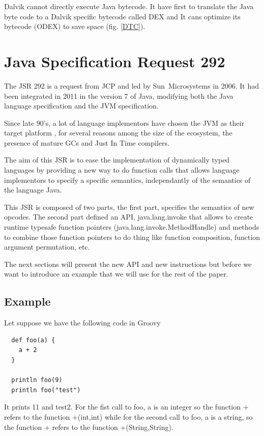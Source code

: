 \documentclass{sigplanconf}
\def \JCP{JCP\xspace}
\def \SUN{\mbox{Sun Microsystems}\xspace}
\def \DALVIK{\mbox{Dalvik}\xspace}
\def \Jsr{JSR\xspace}
\def \JSR{\Jsr 292\xspace}
\def \JVM{JVM\xspace}
\def \DEX{\mbox{DEX}\xspace}
\begin{document}
      \DALVIK cannot directly execute Java bytecode.
      It have first to translate the Java byte code to a \DALVIK specific bytecode called \DEX
      and It cans optimize its bytecode (\mbox{ODEX}) to save space (fig. \ref{DTC}).

  \section{Java Specification Request 292}

    The \JSR is a request from \JCP and led by \SUN in 2006.
    It had been integrated in 2011 in the version 7 of Java,
    modifying both the Java language specification and the \JVM specification.

    Since late 90's, a lot of language
    implementors have chosen the JVM as their target platform \cite{wiki-jvm-lang},
    for several reasons among the size of the ecosystem,
    the presence of mature GCs and Just In Time compilers. 

    The aim of this \Jsr is to ease the implementation of dynamically typed languages
    by providing a new way to do function calls that allows language implementors
    to specify a specific semantics, independantly of the semantics of the language Java.
    
    This \Jsr is composed of two parts, the first part, specifies the semantics of
    new opcodes. The second part defined an API, java.lang.invoke that allows
    to create runtime typesafe function pointers (java.lang.invoke.MethodHandle) and
    methods to combine those function pointers to do thing like function composition,
    function argument permutation, etc.

    The next sections will present the new API and new instructions but before
    we want to introduce an example that we will use for the rest of the paper.

    \subsection{Example}
      Let suppose we have the following code in Groovy \cite{lang-groovy}
      
      {\tiny      
      \begin{verbatim}
  def foo(a) {
    a + 2
  }

  println foo(9)
  println foo("test")
      \end{verbatim}
      }

      It prints 11 and test2. For the fist call to foo, a is an integer so the function + refers
      to the function +(int,int) while for the second call to foo, a is a string, so the
      function + refers to the function +(String,String).
\end{document}
